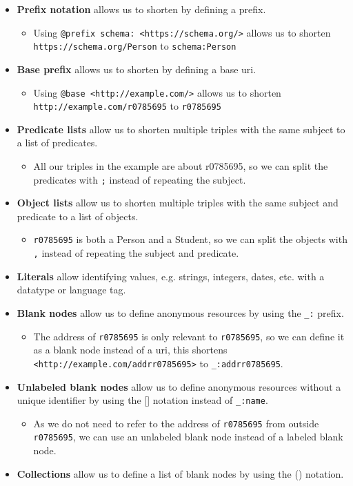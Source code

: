 \begin{itemize}
    \item \textbf{Prefix notation} allows us to shorten  by defining a prefix.
    \begin{itemize}
        \item Using \texttt{@prefix schema: <https://schema.org/>} allows us to shorten \break\texttt{https://schema.org/Person} to \texttt{schema:Person}
    \end{itemize}
    \item \textbf{Base prefix} allows us to shorten  by defining a base \acrshort{uri}.
    \begin{itemize}
        \item Using \texttt{@base <http://example.com/>} allows us to shorten \break\texttt{http://example.com/r0785695} to \texttt{r0785695}
    \end{itemize}
    \item \textbf{Predicate lists} allow us to shorten multiple triples with the same subject to a list of predicates.
    \begin{itemize}
        \item All our triples in the example are about r0785695, so we can split the predicates with \texttt{;} instead of repeating the subject.
    \end{itemize}
    \item \textbf{Object lists} allow us to shorten multiple triples with the same subject and predicate to a list of objects.
    \begin{itemize}
        \item \texttt{r0785695} is both a Person and a Student, so we can split the objects with \texttt{,} instead of repeating the subject and predicate.
    \end{itemize}
    \item \textbf{Literals} allow identifying values, e.g. strings, integers, dates, etc. with a datatype or language tag.
    \item \textbf{Blank nodes} allow us to define anonymous resources by using the \texttt{\_:} prefix.
    \begin{itemize}
        \item The address of \texttt{r0785695} is only relevant to \texttt{r0785695}, so we can define it as a blank node instead of a \acrshort{uri}, this shortens \texttt{<http://example.com/addrr0785695>} to \texttt{\_:addrr0785695}. 
    \end{itemize}
    \item \textbf{Unlabeled blank nodes} allow us to define anonymous resources without a unique identifier by using the [] notation instead of \texttt{\_:name}.
    \begin {itemize}
        \item As we do not need to refer to the address of \texttt{r0785695} from outside \texttt{r0785695}, we can use an unlabeled blank node instead of a labeled blank node.
    \end{itemize}
    \item \textbf{Collections} allow us to define a list of blank nodes by using the () notation.
\end{itemize}
